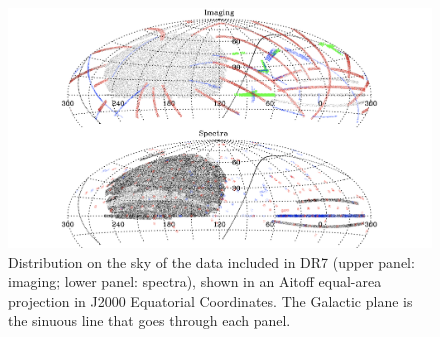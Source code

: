 \begin{figure}[hbtp]
  \centering
  \includegraphics[width=1\textwidth]{SDSS_OFF}
  \caption{Distribution on the sky of the data included in DR7 (upper panel: imaging; lower panel: spectra), shown in an Aitoff equal-area projection in J2000 Equatorial Coordinates. The Galactic plane is the sinuous line that goes through each panel. \cite{2009ApJS..182..543A}}
  \label{3}
\end{figure}


